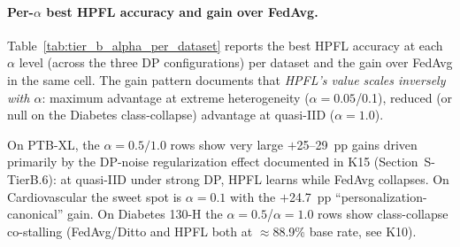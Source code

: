 \documentclass[conference]{IEEEtran}
\begin{document}
\paragraph{Per-$\alpha$ best HPFL accuracy and gain over FedAvg.} Table~\ref{tab:tier_b_alpha_per_dataset} reports the best HPFL accuracy at each $\alpha$ level (across the three DP configurations) per dataset and the gain over FedAvg in the same cell. The gain pattern documents that \emph{HPFL's value scales inversely with $\alpha$}: maximum advantage at extreme heterogeneity ($\alpha{=}0.05$/0.1), reduced (or null on the Diabetes class-collapse) advantage at quasi-IID ($\alpha{=}1.0$).

\begin{table}[htbp]
\centering
\caption{Best HPFL accuracy across the four-level $\alpha$-grid, with gain over FedAvg in the same $(\alpha,\text{DP})$ cell. The pattern confirms the central thesis: HPFL advantage scales with heterogeneity.}
\label{tab:tier_b_alpha_per_dataset}
\small
\setlength{\tabcolsep}{4pt}

\vspace{1mm}
\footnotesize{On PTB-XL, the $\alpha{=}0.5/1.0$ rows show very large $+$25--29~pp gains driven primarily by the DP-noise regularization effect documented in K15 (Section~S-TierB.6): at quasi-IID under strong DP, HPFL learns while FedAvg collapses. On Cardiovascular the sweet spot is $\alpha{=}0.1$ with the $+$24.7~pp ``personalization-canonical'' gain. On Diabetes 130-H the $\alpha{=}0.5$/$\alpha{=}1.0$ rows show class-collapse co-stalling (FedAvg/Ditto and HPFL both at $\approx$88.9\% base rate, see K10).}
\end{table}
\end{document}
